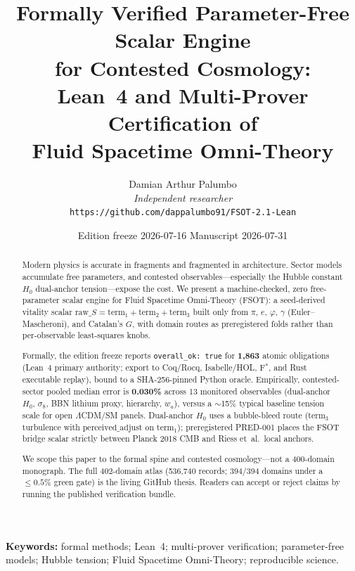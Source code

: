 \documentclass[11pt,a4paper]{article}
\title{Formally Verified Parameter-Free Scalar Engine\\
for Contested Cosmology:\\
Lean~4 and Multi-Prover Certification of\\
Fluid Spacetime Omni-Theory}
\author{Damian Arthur Palumbo\\
\textit{Independent researcher}\\[0.6em]
\texttt{https://github.com/dappalumbo91/FSOT-2.1-Lean}}
\date{Edition freeze 2026-07-16 \quad Manuscript 2026-07-31}
\begin{document}
\maketitle

\begin{abstract}
Modern physics is accurate in fragments and fragmented in architecture.
Sector models accumulate free parameters, and contested observables---especially
the Hubble constant $H_0$ dual-anchor tension---expose the cost.
We present a machine-checked, zero free-parameter scalar engine for
Fluid Spacetime Omni-Theory (FSOT): a seed-derived vitality scalar
$\mathrm{raw}\_S=\mathrm{term}_1+\mathrm{term}_2+\mathrm{term}_3$
built only from $\pi$, $e$, $\varphi$, $\gamma$ (Euler--Mascheroni), and
Catalan's $G$, with domain routes as preregistered folds rather than
per-observable least-squares knobs.

Formally, the edition freeze reports
\mbox{\texttt{overall\_ok: true}}
for \textbf{1{,}863} atomic obligations (Lean~4 primary authority; export to
Coq/Rocq, Isabelle/HOL, F$^*$, and Rust executable replay), bound to a
SHA-256-pinned Python oracle.
Empirically, contested-sector pooled median error is \textbf{0.030\%}
across 13 monitored observables (dual-anchor $H_0$, $\sigma_8$, BBN lithium
proxy, hierarchy, $w_a$), versus a $\sim$15\% typical baseline tension scale
for open $\Lambda$CDM/SM panels.
Dual-anchor $H_0$ uses a bubble-bleed route ($\mathrm{term}_3$ turbulence with
$\mathrm{perceived\_adjust}$ on $\mathrm{term}_1$); preregistered PRED-001 places
the FSOT bridge scalar strictly between Planck 2018 CMB and Riess et~al.\ local
anchors.

We scope this paper to the formal spine and contested cosmology---not a
400-domain monograph.
The full 402-domain atlas (536{,}740 records; 394/394 domains under a
$\le 0.5\%$ green gate) is the living GitHub thesis.
Readers can accept or reject claims by running the published verification bundle.
\end{abstract}

\noindent\textbf{Keywords:}
formal methods; Lean~4; multi-prover verification; parameter-free models;
Hubble tension; Fluid Spacetime Omni-Theory; reproducible science.
\end{document}
